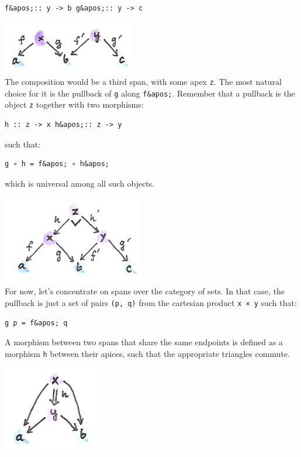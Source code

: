 \begin{verbatim}
f&apos;:: y -> b g&apos;:: y -> c
\end{verbatim}

\includegraphics[width=2.26042in]{images/compspan.png}\\
The composition would be a third span, with some apex \texttt{z}. The
most natural choice for it is the pullback of \texttt{g} along
\texttt{f\&apos;}. Remember that a pullback is the object \texttt{z}
together with two morphisms:

\begin{verbatim}
h :: z -> x h&apos;:: z -> y
\end{verbatim}

such that:

\begin{verbatim}
g ∘ h = f&apos; ∘ h&apos;
\end{verbatim}

which is universal among all such objects.

\includegraphics[width=2.42708in]{images/pullspan.png}\\
For now, let's concentrate on spans over the category of sets. In that
case, the pullback is just a set of pairs \texttt{(p,\ q)} from the
cartesian product \texttt{x\ ×\ y} such that:

\begin{verbatim}
g p = f&apos; q
\end{verbatim}

A morphism between two spans that share the same endpoints is defined as
a morphism \texttt{h} between their apices, such that the appropriate
triangles commute.

\hypertarget{attachment_9111}{}
\includegraphics[width=1.70833in]{images/morphspan.png}

